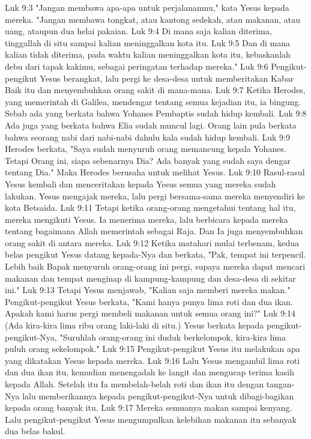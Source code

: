 Luk 9:3  "Jangan membawa apa-apa untuk perjalananmu," kata Yesus kepada mereka. "Jangan membawa tongkat, atau kantong sedekah, atau makanan, atau uang, ataupun dua helai pakaian.
Luk 9:4  Di mana saja kalian diterima, tinggallah di situ sampai kalian meninggalkan kota itu.
Luk 9:5  Dan di mana kalian tidak diterima, pada waktu kalian meninggalkan kota itu, kebaskanlah debu dari tapak kakimu, sebagai peringatan terhadap mereka."
Luk 9:6  Pengikut-pengikut Yesus berangkat, lalu pergi ke desa-desa untuk memberitakan Kabar Baik itu dan menyembuhkan orang sakit di mana-mana.
Luk 9:7  Ketika Herodes, yang memerintah di Galilea, mendengar tentang semua kejadian itu, ia bingung. Sebab ada yang berkata bahwa Yohanes Pembaptis sudah hidup kembali.
Luk 9:8  Ada juga yang berkata bahwa Elia sudah muncul lagi. Orang lain pula berkata bahwa seorang nabi dari nabi-nabi dahulu kala sudah hidup kembali.
Luk 9:9  Herodes berkata, "Saya sudah menyuruh orang memancung kepala Yohanes. Tetapi Orang ini, siapa sebenarnya Dia? Ada banyak yang sudah saya dengar tentang Dia." Maka Herodes berusaha untuk melihat Yesus.
Luk 9:10  Rasul-rasul Yesus kembali dan menceritakan kepada Yesus semua yang mereka sudah lakukan. Yesus mengajak mereka, lalu pergi bersama-sama mereka menyendiri ke kota Betsaida.
Luk 9:11  Tetapi ketika orang-orang mengetahui tentang hal itu, mereka mengikuti Yesus. Ia menerima mereka, lalu berbicara kepada mereka tentang bagaimana Allah memerintah sebagai Raja. Dan Ia juga menyembuhkan orang sakit di antara mereka.
Luk 9:12  Ketika matahari mulai terbenam, kedua belas pengikut Yesus datang kepada-Nya dan berkata, "Pak, tempat ini terpencil. Lebih baik Bapak menyuruh orang-orang ini pergi, supaya mereka dapat mencari makanan dan tempat menginap di kampung-kampung dan desa-desa di sekitar ini."
Luk 9:13  Tetapi Yesus menjawab, "Kalian saja memberi mereka makan." Pengikut-pengikut Yesus berkata, "Kami hanya punya lima roti dan dua ikan. Apakah kami harus pergi membeli makanan untuk semua orang ini?"
Luk 9:14  (Ada kira-kira lima ribu orang laki-laki di situ.) Yesus berkata kepada pengikut-pengikut-Nya, "Suruhlah orang-orang ini duduk berkelompok, kira-kira lima puluh orang sekelompok."
Luk 9:15  Pengikut-pengikut Yesus itu melakukan apa yang dikatakan Yesus kepada mereka.
Luk 9:16  Lalu Yesus mengambil lima roti dan dua ikan itu, kemudian menengadah ke langit dan mengucap terima kasih kepada Allah. Setelah itu Ia membelah-belah roti dan ikan itu dengan tangan-Nya lalu memberikannya kepada pengikut-pengikut-Nya untuk dibagi-bagikan kepada orang banyak itu.
Luk 9:17  Mereka semuanya makan sampai kenyang. Lalu pengikut-pengikut Yesus mengumpulkan kelebihan makanan itu sebanyak dua belas bakul.
